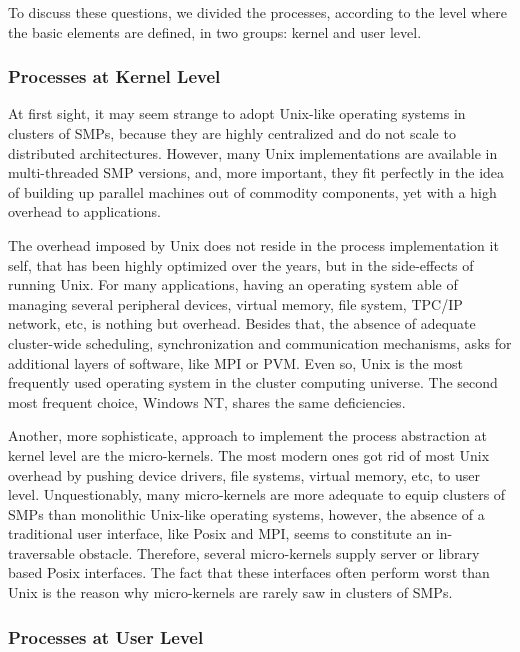 	To discuss these questions, we divided the processes, according to the level where the basic elements are defined, in two groups: kernel and user level.
	
	
\subsubsection{\label{soft_proc_kern}Processes at Kernel Level}

	At first sight, it may seem strange to adopt Unix-like operating systems in clusters of SMPs, because they are highly centralized and do not scale to distributed architectures. However, many Unix implementations are available in multi-threaded SMP versions, and, more important, they fit perfectly in the idea of building up parallel machines out of commodity components, yet with a high overhead to applications.
	
	The overhead imposed by Unix does not reside in the process implementation it self, that has been highly optimized over the years, but in the side-effects of running Unix. For many applications, having an operating system able of managing several peripheral devices, virtual memory, file system, TPC/IP network, etc, is nothing but overhead. Besides that, the absence of adequate cluster-wide scheduling, synchronization and communication mechanisms, asks for additional layers of software, like MPI or PVM. Even so, Unix is the most frequently used operating system in the cluster computing universe. The second most frequent choice, Windows NT, shares the same deficiencies.
	
	Another, more sophisticate, approach to implement the process abstraction at kernel level are the micro-kernels. The most modern ones got rid of most Unix overhead by pushing device drivers, file systems, virtual memory, etc, to user level. Unquestionably, many micro-kernels are more adequate to equip clusters of SMPs than monolithic Unix-like operating systems, however, the absence of a traditional user interface, like Posix and MPI, seems to constitute an in-traversable obstacle. Therefore, several micro-kernels supply server or library based Posix interfaces. The fact that these interfaces often perform worst than Unix is the reason why micro-kernels are rarely saw in clusters of SMPs.


\subsubsection{\label{soft_proc_user}Processes at User Level}

